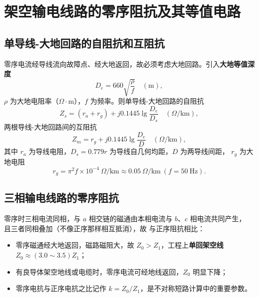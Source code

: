
\section{架空输电线路的零序阻抗及其等值电路}

\subsection{单导线-大地回路的自阻抗和互阻抗}

零序电流经导线流向故障点、经大地返回，故必须考虑大地回路。引入\textbf{大地等值深度}
\begin{equation}
  D_e=660\sqrt{\frac{\rho}{f}}\quad(\text{m}),
\end{equation}
$\rho$ 为大地电阻率（$\Omega\cdot$m），$f$ 为频率。则单导线-大地回路的自阻抗
\begin{equation}
  Z_s=\left(r_a+r_g\right)+j0.1445\lg\frac{D_e}{D_s}\quad(\Omega/\text{km}),
\end{equation}
两根导线-大地回路间的互阻抗
\begin{equation}
  Z_m=r_g+j0.1445\lg\frac{D_e}{D}\quad(\Omega/\text{km}),
\end{equation}
其中 $r_a$ 为导线电阻，$D_s=0.779r$ 为导线自几何均距，$D$ 为两导线间距，
$r_g$ 为大地电阻
\begin{equation}
  r_g=\pi^{2}f\times10^{-4}\ \Omega/\text{km}\approx0.05\ \Omega/\text{km}\ (f=50\ \text{Hz}).
\end{equation}

\subsection{三相输电线路的零序阻抗}

零序时三相电流同相，与 $a$ 相交链的磁通由本相电流与 $b$、$c$ 相电流共同产生，
且三者同相叠加（不像正序那样相互抵消），故
与正序阻抗相比：
\begin{itemize}
  \item 零序磁通经大地返回，磁路磁阻大，故 $Z_0>Z_1$，工程上\textbf{单回架空线}
        $Z_0\approx(3.0\sim3.5)Z_1$；
  \item 有良导体架空地线或电缆时，零序电流可经地线返回，$Z_0$ 明显下降；
  \item 零序电抗与正序电抗之比记作 $k=Z_0/Z_1$，是不对称短路计算中的重要参数。
\end{itemize}

